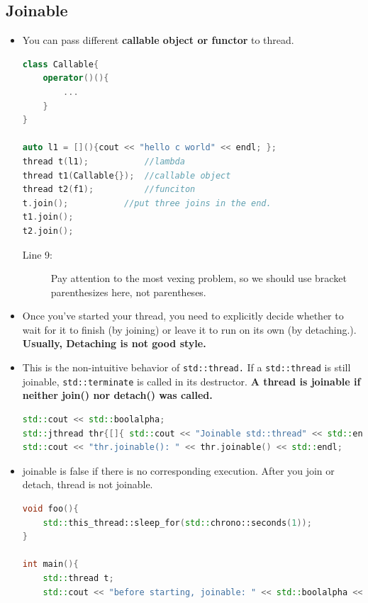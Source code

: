 \documentclass[a4paper,11pt,twoside]{book}
\begin{document}
\subsection{Joinable}
\begin{itemize}

	\item You can pass different \textbf{callable object or functor} to thread. 
\begin{lstlisting}[frame=single, language=c++]
class Callable{
	operator()(){
		...
	}
}

auto l1 = [](){cout << "hello c world" << endl; };
thread t(l1);           //lambda
thread t1(Callable{});  //callable object
thread t2(f1);          //funciton
t.join();           //put three joins in the end.
t1.join();
t2.join();
\end{lstlisting}

\begin{description}
	\item[Line 9:] Pay attention to the most vexing problem, so we should use bracket parenthesizes here, not parentheses.
\end{description}

	\item Once you've started your thread, you need to explicitly decide whether to wait for it to finish (by joining) or leave it to run on its own (by detaching.). \textbf{Usually, Detaching is not good style.}
	
	\item This is the non-intuitive behavior of \texttt{std::thread.} If a \texttt{std::thread} is still joinable, \texttt{std::terminate} is called in its destructor. \textbf{A thread is joinable if neither join() nor detach() was called.}
	
\begin{lstlisting}[frame=single, language=c++]
std::cout << std::boolalpha;
std::jthread thr{[]{ std::cout << "Joinable std::thread" << std::endl; }};
std::cout << "thr.joinable(): " << thr.joinable() << std::endl;	
\end{lstlisting}
	
	\item joinable is false if there is no corresponding execution. After you join or detach, thread is not joinable.

\begin{lstlisting}[frame=single, language=c++]
void foo(){
	std::this_thread::sleep_for(std::chrono::seconds(1));
}

int main(){
	std::thread t;
	std::cout << "before starting, joinable: " << std::boolalpha << t.joinable()
	

\end{lstlisting}
\end{itemize}
\end{document}
